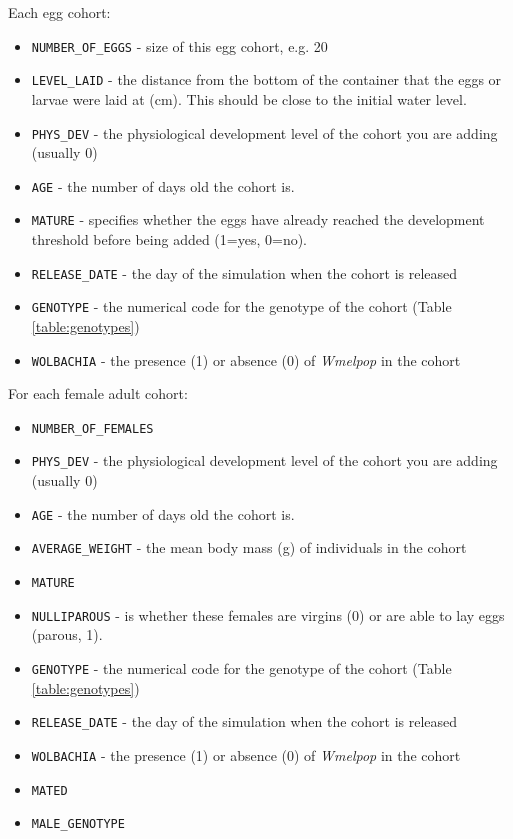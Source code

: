 \documentclass[11pt]{article}
\newcommand{\linecmd}[1]{\texttt{#1}}
\begin{document}
Each egg cohort:

\begin{itemize}
	\item \linecmd{NUMBER\_OF\_EGGS} - size of this egg cohort, e.g. 20 \cite{xu2010understanding}
	\item \linecmd{LEVEL\_LAID} - the distance from the bottom of the container that the eggs or larvae were laid at (cm). This should be close to the initial water level.
	\item \linecmd{PHYS\_DEV} - the physiological development level of the cohort you are adding (usually 0)
	\item \linecmd{AGE} - the number of days old the cohort is.
	\item \linecmd{MATURE} - specifies whether the eggs have already reached the development threshold before being added (1=yes, 0=no).
	\item \linecmd{RELEASE\_DATE} - the day of the simulation when the cohort is released
	\item \linecmd{GENOTYPE} - the numerical code for the genotype of the cohort (Table \ref{table:genotypes})
	\item \linecmd{WOLBACHIA} - the presence (1) or absence (0) of \emph{Wmelpop} in the cohort
\end{itemize}

For each female adult cohort:

\begin{itemize}
	\item \linecmd{NUMBER\_OF\_FEMALES}
	\item \linecmd{PHYS\_DEV} - the physiological development level of the cohort you are adding (usually 0)
	\item \linecmd{AGE} - the number of days old the cohort is.
	\item \linecmd{AVERAGE\_WEIGHT} - the mean body mass (g) of individuals in the cohort
	\item \linecmd{MATURE}
	\item \linecmd{NULLIPAROUS} - is whether these females are virgins (0) or are able to lay eggs (parous, 1).
	\item \linecmd{GENOTYPE} - the numerical code for the genotype of the cohort (Table \ref{table:genotypes})
	\item \linecmd{RELEASE\_DATE} - the day of the simulation when the cohort is released
	\item \linecmd{WOLBACHIA} - the presence (1) or absence (0) of \emph{Wmelpop} in the cohort
	\item \linecmd{MATED}
	\item \linecmd{MALE\_GENOTYPE}
\end{itemize}
\end{document}
